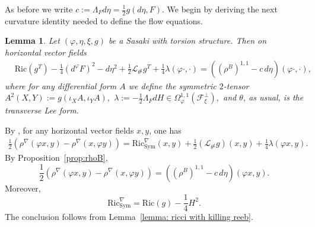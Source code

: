 \documentclass{article}
\makeatletter
\renewenvironment{proof}[1][\proofname]{%
  \par\pushQED{\qed}%
  \normalfont\topsep6\p@\@plus6\p@\relax
  \trivlist
  \item[\hskip\labelsep
        \textbf{\textup{#1}}\@addpunct{.}]\ignorespaces
}{%
  \popQED\endtrivlist\@endpefalse
}
\newtheorem{lem}[thm]{Lemma}
\theoremstyle{definition}
\renewcommand{\phi}{\varphi}
\numberwithin{equation}{section}
\makeatother
\begin{document}
As before we write $c:=\Lambda_Fd\eta=\tfrac 12 g(d\eta, F)$. We begin by deriving the next curvature identity needed to define the flow equations. 
\begin{lem} \label{lem: 1,1}
Let $(\phi,\eta,\xi,g)$ be a Sasaki with torsion structure. Then on horizontal vector fields
\[
\begin{aligned}
&\mathrm{Ric}(g^T)-\frac14(d^\phi F)^2 -d\eta^2
+\frac12\mathcal L_{\theta^\sharp}g^T
+\frac14\lambda(\phi\cdot,\cdot)=
\left((\rho^B)^{1,1}-c\,d\eta\right)(\phi\cdot,\cdot),
\end{aligned}
\]
where for any differential form $A$ we define the symmetric $2$-tensor
$
A^2(X,Y):=g(\iota_XA,\iota_YA),$
$
\lambda:=-\frac12\Lambda_FdH
\in\Omega^{1,1}_\phi(\mathcal F_\xi^\perp),
$ and $\theta$, as usual, is the transverse Lee form.
\end{lem}

\begin{proof}
By \cite[Proposition 9.1]{FI}, for any horizontal vector fields $x,y$, one has
\[
\begin{aligned}
\frac12\left(
\rho^\nabla(\phi x,y)-\rho^\nabla(x,\phi y)
\right)=
\mathrm{Ric}^\nabla_{\mathrm{Sym}}(x,y)
+\frac12(\mathcal L_{\theta^\sharp}g)(x,y)
+\frac14\lambda(\phi x,y).
\end{aligned}
\]
By Proposition~\ref{prop:rhoB},
\[
\frac12\left(
\rho^\nabla(\phi x,y)-\rho^\nabla(x,\phi y)
\right)
=
\left((\rho^B)^{1,1}-c\,d\eta\right)(\phi x,y).
\]
Moreover,
\[
\mathrm{Ric}^\nabla_{\mathrm{Sym}}
=
\mathrm{Ric}(g)-\frac14H^2.
\]
The conclusion follows from 
Lemma~\ref{lemma: ricci with killing reeb}.
\end{proof}
\end{document}
